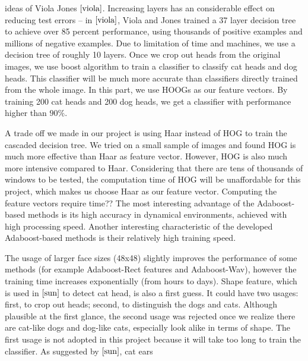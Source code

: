 \documentclass[12pt]{article}
\begin{document}
ideas of Viola Jones $\cite{viola}$. Increasing layers has an considerable effect on reducing test errors -- in $\cite{viola}$, Viola and Jones trained a 37 layer decision tree to achieve over 85 percent performance, using thousands of positive examples and millions of negative examples. Due to limitation of time and machines, we use a decision tree of roughly 10 layers. Once we crop out heads from the original images, we use boost algorithm to train a classifier to classify cat heads and dog heads. This classifier will be much more accurate than classifiers directly trained from the whole image. In this part, we use HOOGs as our feature vectors. By training 200 cat heads and 200 dog heads, we get a classifier with performance higher than $90\%$.  

A trade off we made in our project is using Haar instead of HOG to train the cascaded decision tree. We tried on a small sample of images and found HOG is much more effective than Haar as feature vector. However, HOG is also much more intensive compared to Haar. Considering that there are tens of thousands of windows to be tested, the computation time of HOG will be unaffordable for this project, which makes us choose Haar as our feature vector. Computing the feature vectors require time??
The most interesting advantage of the Adaboost-based methods is its high accuracy
in dynamical environments, achieved with high processing speed.  Another interesting characteristic of the developed Adaboost-based methods is their relatively high training speed.


The usage of larger face sizes (48x48) slightly improves the performance of some methods (for example Adaboost-Rect features and Adaboost-Wav), however the training time increases exponentially (from hours to days).
Shape feature, which is used in $\cite{sun}$ to detect cat head, is also a first guess. It could have two usages: first, to crop out heads; second, to distinguish the dogs and cats. Although plausible at the first glance, the second usage was rejected once we realize there are cat-like dogs and dog-like cats, especially look alike in terms of shape. The first usage is not adopted in this project because it will take too long to train the classifier. As suggested by $\cite{sun}$, 
cat ears
\end{document}
